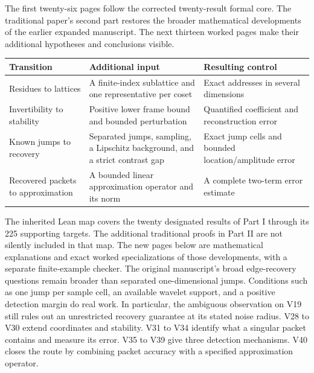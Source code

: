 The first twenty-six pages follow the corrected twenty-result formal core. The traditional paper's second part restores the broader mathematical developments of the earlier expanded manuscript. The next thirteen worked pages make their additional hypotheses and conclusions visible.
\begin{tabularx}{\linewidth}{@{}>{\raggedright\arraybackslash}p{.21\linewidth}YY@{}}\toprule
Transition & Additional input & Resulting control\\\midrule
Residues to lattices & A finite-index sublattice and one representative per coset & Exact addresses in several dimensions\\
Invertibility to stability & Positive lower frame bound and bounded perturbation & Quantified coefficient and reconstruction error\\
Known jumps to recovery & Separated jumps, sampling, a Lipschitz background, and a strict contrast gap & Exact jump cells and bounded location/amplitude error\\
Recovered packets to approximation & A bounded linear approximation operator and its norm & A complete two-term error estimate\\\bottomrule
\end{tabularx}
The inherited Lean map covers the twenty designated results of Part I through its 225 supporting targets. The additional traditional proofs in Part II are not silently included in that map. The new pages below are mathematical explanations and exact worked specializations of those developments, with a separate finite-example checker.
The original manuscript's broad edge-recovery questions remain broader than separated one-dimensional jumps. Conditions such as one jump per sample cell, an available wavelet support, and a positive detection margin do real work. In particular, the ambiguous observation on V19 still rules out an unrestricted recovery guarantee at its stated noise radius.
V28 to V30 extend coordinates and stability. V31 to V34 identify what a singular packet contains and measure its error. V35 to V39 give three detection mechanisms. V40 closes the route by combining packet accuracy with a specified approximation operator.


